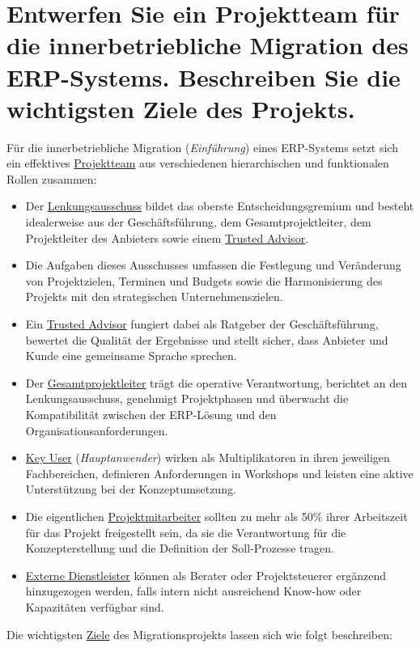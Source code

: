 \section{Entwerfen Sie ein Projektteam für die innerbetriebliche Migration des \acs{ERP}-Systems. Beschreiben Sie die wichtigsten Ziele des Projekts.} \par Für die innerbetriebliche Migration (\textit{Einführung}) eines \acs{ERP}-Systems setzt sich ein effektives \uline{Projektteam} aus verschiedenen hierarchischen und funktionalen Rollen zusammen:
\begin{itemize}
    \item Der \uline{Lenkungsausschuss} bildet das oberste Entscheidungsgremium und besteht idealerweise aus der Geschäftsführung, dem Gesamtprojektleiter, dem Projektleiter des Anbieters sowie einem \uline{Trusted Advisor}. \cite{22}
    \item Die Aufgaben dieses Ausschusses umfassen die Festlegung und Veränderung von Projektzielen, Terminen und Budgets sowie die Harmonisierung des Projekts mit den strategischen Unternehmenszielen. \cite{23}
    \item Ein \uline{Trusted Advisor} fungiert dabei als Ratgeber der Geschäftsführung, bewertet die Qualität der Ergebnisse und stellt sicher, dass Anbieter und Kunde eine gemeinsame Sprache sprechen. \cite{22}\cite{24}
    \item Der \uline{Gesamtprojektleiter} trägt die operative Verantwortung, berichtet an den Lenkungsausschuss, genehmigt Projektphasen und überwacht die Kompatibilität zwischen der \acs{ERP}-Lösung und den Organisationsanforderungen. \cite{25}
    \item \uline{Key User} (\textit{Hauptanwender}) wirken als Multiplikatoren in ihren jeweiligen Fachbereichen, definieren Anforderungen in Workshops und leisten eine aktive Unterstützung bei der Konzeptumsetzung. \cite{25}
    \item Die eigentlichen \uline{Projektmitarbeiter} sollten zu mehr als 50\% ihrer Arbeitszeit für das Projekt freigestellt sein, da sie die Verantwortung für die Konzepterstellung und die Definition der Soll-Prozesse tragen. \cite{26}\cite{27}
    \item \uline{Externe Dienstleister} können als Berater oder Projektsteuerer ergänzend hinzugezogen werden, falls intern nicht ausreichend Know-how oder Kapazitäten verfügbar sind. \cite{28}
\end{itemize}
Die wichtigsten \uline{Ziele} des Migrationsprojekts lassen sich wie folgt beschreiben:

